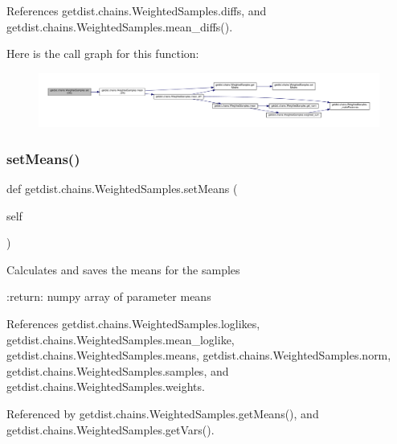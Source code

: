 References getdist.\+chains.\+Weighted\+Samples.\+diffs, and getdist.\+chains.\+Weighted\+Samples.\+mean\+\_\+diffs().

Here is the call graph for this function\+:
\nopagebreak
\begin{figure}[H]
\begin{center}
\leavevmode
\includegraphics[width=350pt]{classgetdist_1_1chains_1_1WeightedSamples_aa76342740cc0252dbaa1ebbd8e254853_cgraph}
\end{center}
\end{figure}
\mbox{\label{classgetdist_1_1chains_1_1WeightedSamples_a977e6b59952fb92233a9e2d330c984ad}} 
\subsubsection{\texorpdfstring{set\+Means()}{setMeans()}}
{\footnotesize\ttfamily def getdist.\+chains.\+Weighted\+Samples.\+set\+Means (\begin{DoxyParamCaption}\item[{}]{self }\end{DoxyParamCaption})}

\begin{DoxyVerb}Calculates and saves the means for the samples
     
:return: numpy array of parameter means
\end{DoxyVerb}
 

References getdist.\+chains.\+Weighted\+Samples.\+loglikes, getdist.\+chains.\+Weighted\+Samples.\+mean\+\_\+loglike, getdist.\+chains.\+Weighted\+Samples.\+means, getdist.\+chains.\+Weighted\+Samples.\+norm, getdist.\+chains.\+Weighted\+Samples.\+samples, and getdist.\+chains.\+Weighted\+Samples.\+weights.



Referenced by getdist.\+chains.\+Weighted\+Samples.\+get\+Means(), and getdist.\+chains.\+Weighted\+Samples.\+get\+Vars().

